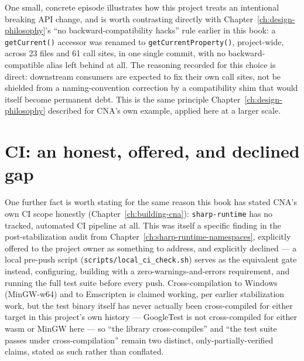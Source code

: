 One small, concrete episode illustrates how this project treats an intentional breaking API
change, and is worth contrasting directly with Chapter~\ref{ch:design-philosophy}'s ``no
backward-compatibility hacks'' rule earlier in this book: a \texttt{getCurrent()} accessor was renamed
to \texttt{getCurrentProperty()}, project-wide, across 23 files and 61 call sites, in one
single commit, with no backward-compatible alias left behind at all. The reasoning recorded
for this choice is direct: downstream consumers are expected to fix their own call sites, not
be shielded from a naming-convention correction by a compatibility shim that would itself
become permanent debt. This is the same principle Chapter~\ref{ch:design-philosophy}
described for CNA's own  example, applied here at a larger
scale.

\section{CI: an honest, offered, and declined gap}

One further fact is worth stating for the same reason this book has stated CNA's own CI scope
honestly (Chapter~\ref{ch:building-cna}): \texttt{sharp-runtime} has no tracked,
automated CI pipeline at all. This was itself a specific finding in the post-stabilization
audit from Chapter~\ref{ch:sharp-runtime-namespaces}, explicitly offered to the project owner
as something to address, and explicitly declined --- a local pre-push script
(\texttt{scripts/local\_ci\_check.sh}) serves as the equivalent gate instead, configuring,
building with a zero-warnings-and-errors requirement, and running the full test suite before
every push. Cross-compilation to Windows (MinGW-w64) and to Emscripten is claimed working, per
earlier stabilization work, but the test binary itself has never actually been cross-compiled
for either target in this project's own history --- GoogleTest is not cross-compiled for
either wasm or MinGW here --- so ``the library cross-compiles'' and ``the test suite passes
under cross-compilation'' remain two distinct, only-partially-verified claims, stated as such
rather than conflated.

